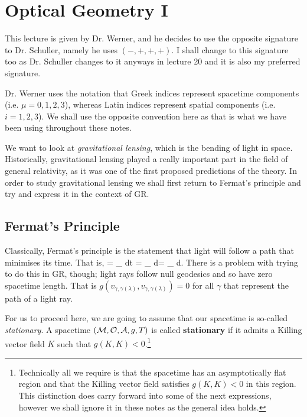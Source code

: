 \chapter{Optical Geometry I}

\br 
\label{rem:SigChange}
    This lecture is given by Dr. Werner, and he decides to use the opposite signature to Dr. Schuller, namely he uses $(-,+,+,+)$. I shall change to this signature too as Dr. Schuller changes to it anyways in lecture 20 and it is also my preferred signature. 
\er 

\bnn 
    Dr. Werner uses the notation that Greek indices represent spacetime components (i.e. $\mu=0,1,2,3$), whereas Latin indices represent spatial components (i.e. $i=1,2,3$). We shall use the opposite convention here as that is what we have been using throughout these notes.
\enn 

We want to look at \textit{gravitational lensing}, which is the bending of light in space. Historically, gravitational lensing played a really important part in the field of general relativity, as it was one of the first proposed predictions of the theory. In order to study gravitational lensing we shall first return to Fermat's principle and try and express it in the context of GR. 

\section{Fermat's Principle}

Classically, Fermat's principle is the statement that light will follow a path that minimises its time. That is, 
 = \del \int_{\gamma} dt = \del \int_{\gamma} d\ell = \del\int_{\gamma} d\ell. 
\ese 
There is a problem with trying to do this in GR, though; light rays follow null geodesics and so have zero spacetime length. That is $g(v_{\gamma,\gamma(\lambda)},v_{\gamma,\gamma(\lambda)})=0$ for all $\gamma$ that represent the path of a light ray. 

For us to proceed here, we are going to assume that our spacetime is so-called \textit{stationary}. 
    A spacetime $(\mathcal{M},\mathcal{O},\mathcal{A},g,T)$ is called \textbf{stationary} if it admits a Killing vector field $K$ such that $g(K,K)<0$.\footnote{Technically all we require is that the spacetime has an asymptotically flat region and that the Killing vector field satisfies $g(K,K)<0$ in this region. This distinction does carry forward into some of the next expressions, however we shall ignore it in these notes as the general idea holds.}
\ed 


